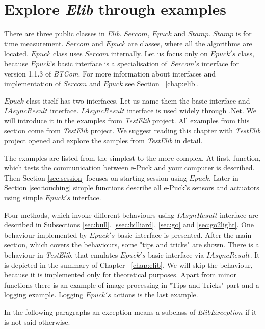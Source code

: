 \section{Explore {\it Elib} through examples} \label{sec:interfaces}
  There are three public classes in {\it Elib}. $Sercom$, $Epuck$ and $Stamp$.
  $Stamp$ is for time measurement. $Sercom$ and $Epuck$ are classes, where all the algorithms are located.
  $Epuck$ class uses $Sercom$ internally.
  Let us focus only on $Epuck's$ class, because $Epuck$'s basic interface is a specialisation of~$Sercom$'s
  interface for version 1.1.3 of {\it BTCom}.
  For more information about interfaces and implementation of $Sercom$ and $Epuck$ see Section ~\ref{chap:elib}.

  $Epuck$ class itself has two interfaces. Let us name them the basic interface and $IAsyncResult$ interface.
  $IAsyncResult$ interface is used widely through .Net. We will introduce it in the examples from {\it TestElib} project.
  All examples from this section come from {\it TestElib} project. We suggest reading this chapter with {\it TestElib} project opened
  and explore the samples from {\it TestElib} in detail.


  The examples are listed from the simplest to the more complex. 
  At first, function, which tests the communication between e-Puck and your computer is described.
  Then Section \ref{sec:session} focuses on starting session using $Epuck$.
  Later in Section \ref{sec:touching} simple functions describe all e-Puck's sensors and actuators using simple $Epuck's$ interface.
  
  Four methods, which invoke different behaviours using $IAsynResult$ 
  interface are described in Subsections
  \ref{sec:bull}, \ref{ssec:billiard}, \ref{sec:go} and \ref{sec:go2light}.
  One behaviour implemented by $Epuck's$ basic interface is presented.
  After the main section, which covers the behaviours, some "tips and tricks" are shown.
  There is a behaviour in {\it TestElib}, that emulates $Epuck's$ basic interface via $IAsyncResult$. 
  It is depicted in the summary of Chapter ~\ref{chap:elib}.
  We will skip the behaviour, because it is implemented only for theoretical purposes.
  Apart from minor functions there is an example of image processing in "Tips and Tricks" part and a logging example.
  Logging $Epuck's$ actions is the last example.
  \begin{remark}
  In the following paragraphs an exception means a subclass of $ElibException$ if it is not said otherwise.
  \end{remark}
    
